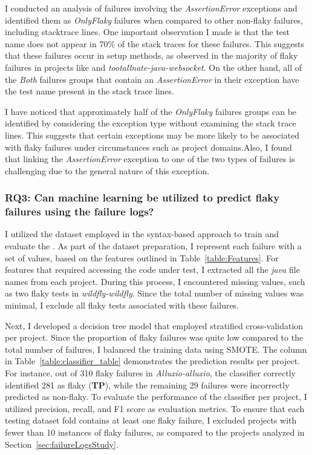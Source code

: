 I conducted an analysis of failures involving the \emph{AssertionError} exceptions and identified them as \emph{OnlyFlaky} failures when compared to other non-flaky failures, including stacktrace lines. One important observation I made is that the test name does not appear in 70\% of the stack traces for these failures. This suggests that these failures occur in setup methods, as observed in the majority of flaky failures in projects like \okhttp and \emph{tootallnate-java-websocket}. On the other hand, all of the \emph{Both} failures groups that contain an \emph{AssertionError} in their exception have the test name present in the stack trace lines.

I have noticed that approximately half of the \emph{OnlyFlaky} failures groups can be identified by considering the exception type without examining the stack trace lines. This suggests that certain exceptions may be more likely to be associated with flaky failures under circumstances such as project domains.Also, I found that linking the \emph{AssertionError} exception to one of the two types of failures is challenging due to the general nature of this exception. 


\subsubsection{RQ3: Can machine learning be utilized to predict flaky failures using the failure logs?}

I utilized the dataset employed in the syntax-based approach to train and evaluate the \classifier. As part of the dataset preparation, I represent each failure with  a set of values, based on the features outlined in Table~\ref{table:Features}. For features that required accessing the code under test, I extracted all the \emph{java} file names from each project. During this process, I encountered missing values, such as two flaky tests in \emph{wildfly-wildfly}. Since the total number of missing values was minimal, I exclude all flaky tests associated with these failures.

Next, I developed a decision tree model that employed stratified cross-validation per project. Since the proportion of flaky failures was quite low compared to the total number of failures, I balanced the training data using SMOTE. The \classifier column in Table~\ref{table:classifier_table} demonstrates the prediction results per project. For instance, out of 310 flaky failures in \emph{Alluxio-alluxio}, the classifier correctly identified 281 as flaky (\textbf{TP}), while the remaining 29 failures were incorrectly predicted as non-flaky. To evaluate the performance of the classifier per project, I utilized precision, recall, and F1 score as evaluation metrics. To ensure that each testing dataset fold contains at least one flaky failure, I excluded projects with fewer than 10 instances of flaky failures, as compared to the projects analyzed in Section~\ref{sec:failureLogsStudy}.

